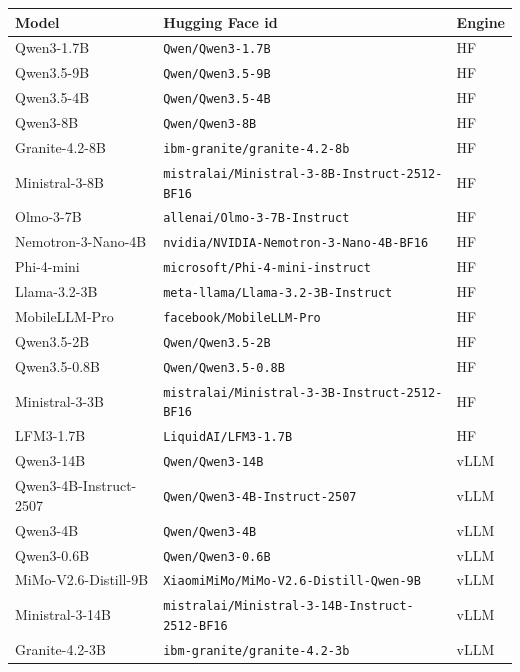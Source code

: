 \begin{tabular}{lll}
\toprule
Model & Hugging Face id & Engine \\
\midrule
Qwen3-1.7B & \texttt{\footnotesize Qwen/Qwen3-1.7B} & HF \\
Qwen3.5-9B & \texttt{\footnotesize Qwen/Qwen3.5-9B} & HF \\
Qwen3.5-4B & \texttt{\footnotesize Qwen/Qwen3.5-4B} & HF \\
Qwen3-8B & \texttt{\footnotesize Qwen/Qwen3-8B} & HF \\
Granite-4.2-8B & \texttt{\footnotesize ibm-granite/granite-4.2-8b} & HF \\
Ministral-3-8B & \texttt{\footnotesize mistralai/Ministral-3-8B-Instruct-2512-BF16} & HF \\
Olmo-3-7B & \texttt{\footnotesize allenai/Olmo-3-7B-Instruct} & HF \\
Nemotron-3-Nano-4B & \texttt{\footnotesize nvidia/NVIDIA-Nemotron-3-Nano-4B-BF16} & HF \\
Phi-4-mini & \texttt{\footnotesize microsoft/Phi-4-mini-instruct} & HF \\
Llama-3.2-3B & \texttt{\footnotesize meta-llama/Llama-3.2-3B-Instruct} & HF \\
MobileLLM-Pro & \texttt{\footnotesize facebook/MobileLLM-Pro} & HF \\
Qwen3.5-2B & \texttt{\footnotesize Qwen/Qwen3.5-2B} & HF \\
Qwen3.5-0.8B & \texttt{\footnotesize Qwen/Qwen3.5-0.8B} & HF \\
Ministral-3-3B & \texttt{\footnotesize mistralai/Ministral-3-3B-Instruct-2512-BF16} & HF \\
LFM3-1.7B & \texttt{\footnotesize LiquidAI/LFM3-1.7B} & HF \\
Qwen3-14B & \texttt{\footnotesize Qwen/Qwen3-14B} & vLLM \\
Qwen3-4B-Instruct-2507 & \texttt{\footnotesize Qwen/Qwen3-4B-Instruct-2507} & vLLM \\
Qwen3-4B & \texttt{\footnotesize Qwen/Qwen3-4B} & vLLM \\
Qwen3-0.6B & \texttt{\footnotesize Qwen/Qwen3-0.6B} & vLLM \\
MiMo-V2.6-Distill-9B & \texttt{\footnotesize XiaomiMiMo/MiMo-V2.6-Distill-Qwen-9B} & vLLM \\
Ministral-3-14B & \texttt{\footnotesize mistralai/Ministral-3-14B-Instruct-2512-BF16} & vLLM \\
Granite-4.2-3B & \texttt{\footnotesize ibm-granite/granite-4.2-3b} & vLLM \\

\end{tabular}
